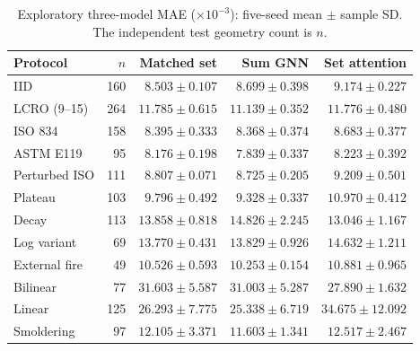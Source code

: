 \begin{table}[t]
\centering\small
\caption{Exploratory three-model MAE ($\times10^{-3}$): five-seed mean $\pm$ sample SD. The independent test geometry count is $n$.}
\label{tab:exploratory_attention_mae}
\begin{tabular}{lrrrr}
\toprule
Protocol & $n$ & Matched set & Sum GNN & Set attention \\
\midrule
IID & 160 & $8.503 \pm 0.107$ & $8.699 \pm 0.398$ & $9.174 \pm 0.227$ \\
LCRO (9--15) & 264 & $11.785 \pm 0.615$ & $11.139 \pm 0.352$ & $11.776 \pm 0.480$ \\
\midrule
ISO 834 & 158 & $8.395 \pm 0.333$ & $8.368 \pm 0.374$ & $8.683 \pm 0.377$ \\
ASTM E119 & 95 & $8.176 \pm 0.198$ & $7.839 \pm 0.337$ & $8.223 \pm 0.392$ \\
Perturbed ISO & 111 & $8.807 \pm 0.071$ & $8.725 \pm 0.205$ & $9.209 \pm 0.501$ \\
Plateau & 103 & $9.796 \pm 0.492$ & $9.328 \pm 0.337$ & $10.970 \pm 0.412$ \\
Decay & 113 & $13.858 \pm 0.818$ & $14.826 \pm 2.245$ & $13.046 \pm 1.167$ \\
Log variant & 69 & $13.770 \pm 0.431$ & $13.829 \pm 0.926$ & $14.632 \pm 1.211$ \\
External fire & 49 & $10.526 \pm 0.593$ & $10.253 \pm 0.154$ & $10.881 \pm 0.965$ \\
Bilinear & 77 & $31.603 \pm 5.587$ & $31.003 \pm 5.287$ & $27.890 \pm 1.632$ \\
Linear & 125 & $26.293 \pm 7.775$ & $25.338 \pm 6.719$ & $34.675 \pm 12.092$ \\
Smoldering & 97 & $12.105 \pm 3.371$ & $11.603 \pm 1.341$ & $12.517 \pm 2.467$ \\
\bottomrule
\end{tabular}
\end{table}
